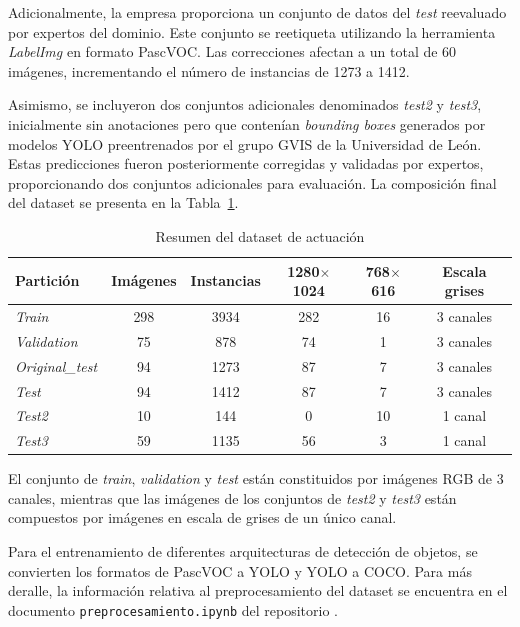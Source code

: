 \documentclass[12pt,a4paper,onecolumn,oneside]{report}
\begin{document}
Adicionalmente, la empresa proporciona un conjunto de datos del \textit{test} reevaluado por expertos del dominio. Este conjunto se reetiqueta utilizando la herramienta \textit{LabelImg} \cite{labelimg_github} en formato PascVOC. 
Las correcciones afectan a un total de 60 imágenes, incrementando el número de instancias de 1273 a 1412.

Asimismo, se incluyeron dos conjuntos adicionales denominados \textit{test2} y \textit{test3}, inicialmente sin anotaciones pero que contenían \textit{bounding boxes} generados por modelos YOLO \cite{ultralytics_models} preentrenados 
por el grupo GVIS de la Universidad de León. Estas predicciones fueron posteriormente corregidas y validadas por expertos, proporcionando dos conjuntos adicionales para evaluación. 
La composición final del dataset se presenta en la Tabla~\ref{tab:dataset_final}.

\clearpage
\begin{table}[htbp]
\caption{Resumen del dataset de actuación}
\centering
{}
\begin{tabular}{l c c c c c}
\toprule
Partición & Imágenes & Instancias & 1280$\times$1024 & 768$\times$616 & Escala grises\\
\midrule
\textit{Train}          & 298 & 3934 & 282 & 16 & 3 canales\\
\textit{Validation}     &  75 &  878 & 74  & 1  & 3 canales\\
\textit{Original\_test} &  94 & 1273 & 87  & 7  & 3 canales\\
\textit{Test}           &  94 & 1412 & 87  & 7  & 3 canales\\
\textit{Test2}          &  10 &  144 & 0   & 10 & 1 canal\\
\textit{Test3}          &  59 & 1135 & 56  & 3  & 1 canal\\
\bottomrule
\end{tabular}
\label{tab:dataset_final}
\end{table}

El conjunto de \textit{train}, \textit{validation} y \textit{test} están constituidos por imágenes RGB de 3 canales, mientras que las imágenes 
de los conjuntos de \textit{test2} y \textit{test3} están compuestos por imágenes en escala de grises de un único canal. 

Para el entrenamiento de diferentes arquitecturas de detección de objetos, se convierten los formatos de PascVOC a YOLO y YOLO a COCO. 
Para más deralle, la información relativa al preprocesamiento del dataset se encuentra en el documento \texttt{preprocesamiento.ipynb} del repositorio \cite{repoTFM}.
\end{document}
